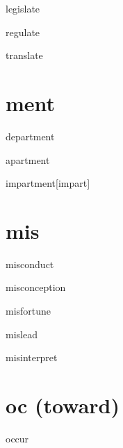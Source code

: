 \begin{RefWord}{legislate}
\end{RefWord}

\begin{RefWord}{regulate}
\end{RefWord}

\begin{RefWord}{translate}
\end{RefWord}

\section{ment}

\begin{RefWord}{department}
\end{RefWord}

\begin{RefWord}{apartment}
\end{RefWord}

\begin{RefWord}{impartment}[impart]
\end{RefWord}

\section{mis}

\begin{RefWord}{misconduct}
\end{RefWord}

\begin{RefWord}{misconception}
\end{RefWord}

\begin{RefWord}{misfortune}
\end{RefWord}

\begin{RefWord}{mislead}
\end{RefWord}

\begin{RefWord}{misinterpret}
\end{RefWord}

\section{oc (toward)}

\begin{RefWord}{occur}
\end{RefWord}

